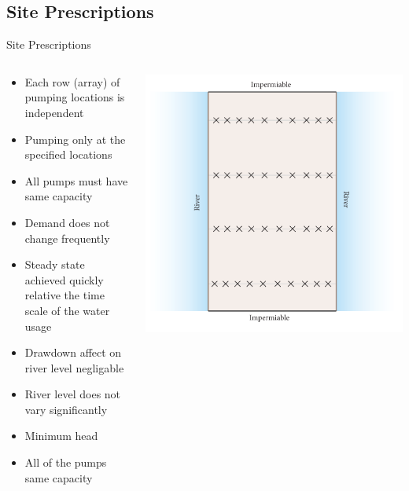 \documentclass[xcolor=x11names,compress]{beamer}
\renewcommand{\(}{\begin{columns}}
\renewcommand{\)}{\end{columns}}
\newcommand{\<}[1]{\begin{column}{#1}}
\renewcommand{\>}{\end{column}}
\begin{document}
\subsection{Site Prescriptions}
\begin{frame}{Site Prescriptions}
\begin{columns}
\begin{column}{.7\textwidth}
\begin{itemize}
\item Each row (array) of pumping locations is independent
\pause
\item Pumping only at the specified locations
\pause
\item All pumps must have same capacity
\pause
\item Demand does not change frequently
\pause
\item Steady state achieved quickly relative the time scale of the water usage 
\pause
\item Drawdown affect on river level negligable
\pause
\item River level does not vary significantly
\pause
\item Minimum head
\pause
\item All of the pumps same capacity
\end{itemize} 
\end{column}
\begin{column}{.3\textwidth}
\onslide\includegraphics[width=\textwidth]{site.pdf}
\end{column}
\end{columns}

\end{frame}
\end{document}
